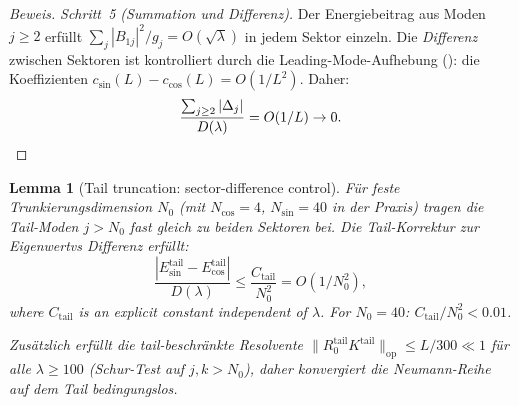 \documentclass[12pt,a4paper]{article}
\newtheorem{lemma}[theorem]{Lemma}
\theoremstyle{definition}
\theoremstyle{remark}
\begin{document}
\begin{proof}[Beweis]
\emph{Schritt~5 (Summation und Differenz).} Der Energiebeitrag aus Moden $j \geq 2$ erfüllt $\sum_j |B_{1j}|^2/g_j = O(\sqrt{\lambda})$ in jedem Sektor einzeln. Die \emph{Differenz} zwischen Sektoren ist kontrolliert durch die Leading-Mode-Aufhebung (): die Koeffizienten $c_{\sin}(L) - c_{\cos}(L) = O(1/L^2)$. Daher:
\[
  \frac{\sum_{j \geq 2}|\Delta_j|}{D(\lambda)} = O(1/L) \to 0. \qedhere
\]
\end{proof}

\begin{lemma}[Tail truncation: sector-difference control]
\label{lem:resolvent-truncation}
Für feste Trunkierungsdimension $N_0$ (mit $N_{\cos} = 4$, $N_{\sin} = 40$ in der Praxis) tragen die Tail-Moden $j > N_0$ fast gleich zu beiden Sektoren bei. Die Tail-Korrektur zur Eigenwertvs \emph{Differenz} erfüllt:
\begin{equation}
\label{eq:tail-diff}
  \frac{|E_{\sin}^{\mathrm{tail}} - E_{\cos}^{\mathrm{tail}}|}{D(\lambda)}
  \leq \frac{C_{\mathrm{tail}}}{N_0^2} = O(1/N_0^2),
\end{equation}
where $C_{\mathrm{tail}}$ is an explicit constant independent of $\lambda$. For $N_0 = 40$: $C_{\mathrm{tail}}/N_0^2 < 0.01$.

Zusätzlich erfüllt die tail-beschränkte Resolvente $\|R_0^{\mathrm{tail}} K^{\mathrm{tail}}\|_{\mathrm{op}} \leq L/300 \ll 1$ für alle $\lambda \geq 100$ (Schur-Test auf $j, k > N_0$), daher konvergiert die Neumann-Reihe auf dem Tail bedingungslos.
\end{lemma}
\end{document}
